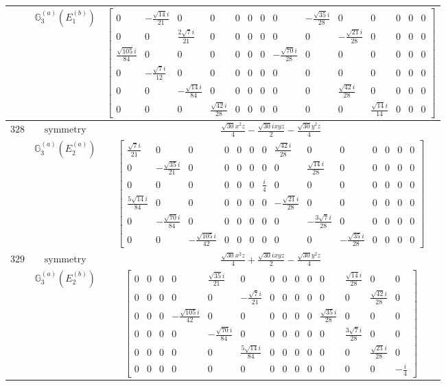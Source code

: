 \documentclass[fleqn,8pt,landscape]{jsarticle}
\begin{document}
\begin{longtable}{ccc}
$  $ & $ \mathbb{G}_{3}^{(a)}(E_{1}^{(b)}) $ & $ \begin{bmatrix} 0 & - \frac{\sqrt{14} i}{21} & 0 & 0 & 0 & 0 & 0 & 0 & - \frac{\sqrt{35} i}{28} & 0 & 0 & 0 & 0 & 0 \\ 0 & 0 & \frac{2 \sqrt{7} i}{21} & 0 & 0 & 0 & 0 & 0 & 0 & - \frac{\sqrt{21} i}{28} & 0 & 0 & 0 & 0 \\ \frac{\sqrt{105} i}{84} & 0 & 0 & 0 & 0 & 0 & 0 & - \frac{\sqrt{70} i}{28} & 0 & 0 & 0 & 0 & 0 & 0 \\ 0 & - \frac{\sqrt{7} i}{12} & 0 & 0 & 0 & 0 & 0 & 0 & 0 & 0 & 0 & 0 & 0 & 0 \\ 0 & 0 & - \frac{\sqrt{14} i}{84} & 0 & 0 & 0 & 0 & 0 & 0 & \frac{\sqrt{42} i}{28} & 0 & 0 & 0 & 0 \\ 0 & 0 & 0 & \frac{\sqrt{42} i}{28} & 0 & 0 & 0 & 0 & 0 & 0 & \frac{\sqrt{14} i}{14} & 0 & 0 & 0 \end{bmatrix} $ \\ \hline
$ 328 $ & $ \text{symmetry} $ & $ \frac{\sqrt{30} x^{2} z}{4} - \frac{\sqrt{30} i x y z}{2} - \frac{\sqrt{30} y^{2} z}{4} $ \\
$  $ & $ \mathbb{G}_{3}^{(a)}(E_{2}^{(a)}) $ & $ \begin{bmatrix} \frac{\sqrt{7} i}{21} & 0 & 0 & 0 & 0 & 0 & 0 & \frac{\sqrt{42} i}{28} & 0 & 0 & 0 & 0 & 0 & 0 \\ 0 & - \frac{\sqrt{35} i}{21} & 0 & 0 & 0 & 0 & 0 & 0 & \frac{\sqrt{14} i}{28} & 0 & 0 & 0 & 0 & 0 \\ 0 & 0 & 0 & 0 & 0 & 0 & \frac{i}{4} & 0 & 0 & 0 & 0 & 0 & 0 & 0 \\ \frac{5 \sqrt{14} i}{84} & 0 & 0 & 0 & 0 & 0 & 0 & - \frac{\sqrt{21} i}{28} & 0 & 0 & 0 & 0 & 0 & 0 \\ 0 & - \frac{\sqrt{70} i}{84} & 0 & 0 & 0 & 0 & 0 & 0 & - \frac{3 \sqrt{7} i}{28} & 0 & 0 & 0 & 0 & 0 \\ 0 & 0 & - \frac{\sqrt{105} i}{42} & 0 & 0 & 0 & 0 & 0 & 0 & - \frac{\sqrt{35} i}{28} & 0 & 0 & 0 & 0 \end{bmatrix} $ \\ \hline
$ 329 $ & $ \text{symmetry} $ & $ \frac{\sqrt{30} x^{2} z}{4} + \frac{\sqrt{30} i x y z}{2} - \frac{\sqrt{30} y^{2} z}{4} $ \\
$  $ & $ \mathbb{G}_{3}^{(a)}(E_{2}^{(b)}) $ & $ \begin{bmatrix} 0 & 0 & 0 & 0 & \frac{\sqrt{35} i}{21} & 0 & 0 & 0 & 0 & 0 & 0 & \frac{\sqrt{14} i}{28} & 0 & 0 \\ 0 & 0 & 0 & 0 & 0 & - \frac{\sqrt{7} i}{21} & 0 & 0 & 0 & 0 & 0 & 0 & \frac{\sqrt{42} i}{28} & 0 \\ 0 & 0 & 0 & - \frac{\sqrt{105} i}{42} & 0 & 0 & 0 & 0 & 0 & 0 & \frac{\sqrt{35} i}{28} & 0 & 0 & 0 \\ 0 & 0 & 0 & 0 & - \frac{\sqrt{70} i}{84} & 0 & 0 & 0 & 0 & 0 & 0 & \frac{3 \sqrt{7} i}{28} & 0 & 0 \\ 0 & 0 & 0 & 0 & 0 & \frac{5 \sqrt{14} i}{84} & 0 & 0 & 0 & 0 & 0 & 0 & \frac{\sqrt{21} i}{28} & 0 \\ 0 & 0 & 0 & 0 & 0 & 0 & 0 & 0 & 0 & 0 & 0 & 0 & 0 & - \frac{i}{4} \end{bmatrix} $ \\ \hline

\end{longtable}
\end{document}

